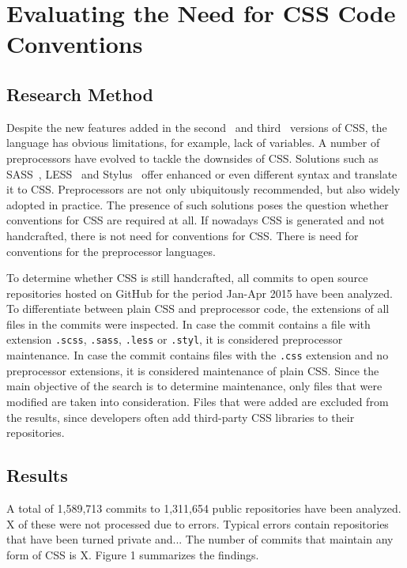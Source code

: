 \documentclass[parskip=full]{uvamscse}
\begin{document}
\chapter{Evaluating the Need for CSS Code Conventions}

\section{Research Method}

Despite the new features added in the second~\cite{CSS2} and third~\cite{CSS3} versions of CSS, the
language has obvious limitations, for example, lack of variables. A number of preprocessors have
evolved to tackle the downsides of CSS. Solutions such as SASS~\cite{SASS}, LESS~\cite{LESS} and
Stylus~\cite{Stylus} offer enhanced or even different syntax and translate it to CSS. Preprocessors
are not only ubiquitously recommended, but also widely adopted in practice. The presence of such
solutions poses the question whether conventions for CSS are required at all. If nowadays CSS is
generated and not handcrafted, there is not need for conventions for CSS. There is need for
conventions for the preprocessor languages.

To determine whether CSS is still handcrafted, all commits to open source repositories hosted on
GitHub for the period Jan-Apr 2015 have been analyzed. To differentiate between plain CSS and
preprocessor code, the extensions of all files in the commits were inspected. In case the commit
contains a file with extension \texttt{.scss}, \texttt{.sass}, \texttt{.less} or \texttt{.styl}, it
is considered preprocessor maintenance. In case the commit contains files with the \texttt{.css}
extension and no preprocessor extensions, it is considered maintenance of plain CSS. Since the main
objective of the search is to determine maintenance, only files that were modified are taken into
consideration. Files that were added are excluded from the results, since developers often add
third-party CSS libraries to their repositories.


\section{Results}

A total of 1,589,713 commits to 1,311,654 public repositories have been analyzed. X of these were not processed due to errors. Typical errors contain repositories that have been turned private and... The number of commits that maintain any form of CSS is X. Figure 1 summarizes the findings.
\end{document}
